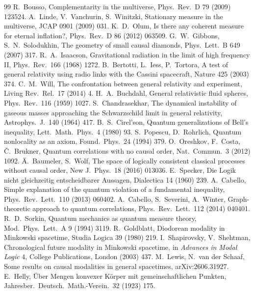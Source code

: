 \documentclass[11pt]{article}
\theoremstyle{definition}
\theoremstyle{remark}
\begin{document}
\begin{thebibliography}{99}
 R.~Bousso, Complementarity in the multiverse, Phys.\ Rev.\ D 79 (2009) 123524.
 A.~Linde, V.~Vanchurin, S.~Winitzki, Stationary measure in the multiverse, JCAP 0901 (2009) 031.
 K.~D.~Olum, Is there any coherent measure for eternal inflation?, Phys.\ Rev.\ D 86 (2012) 063509.
 G.~W.~Gibbons, S.~N.~Solodukhin, The geometry of small causal diamonds, Phys.\ Lett.\ B 649 (2007) 317.
 R.~A.~Isaacson, Gravitational radiation in the limit of high frequency II, Phys.\ Rev.\ 166 (1968) 1272.
 B.~Bertotti, L.~Iess, P.~Tortora, A test of general relativity using radio links with the Cassini spacecraft, Nature 425 (2003) 374.
 C.~M.~Will, The confrontation between general relativity and experiment, Living Rev.\ Rel.\ 17 (2014) 4.
 H.~A.~Buchdahl, General relativistic fluid spheres, Phys.\ Rev.\ 116 (1959) 1027.
 S.~Chandrasekhar, The dynamical instability of gaseous masses approaching the Schwarzschild limit in general relativity, Astrophys.\ J.\ 140 (1964) 417.
 B.~S.~Cirel'son, Quantum generalizations of Bell's inequality, Lett.\ Math.\ Phys.\ 4 (1980) 93.
 S.~Popescu, D.~Rohrlich, Quantum nonlocality as an axiom, Found.\ Phys.\ 24 (1994) 379.
 O.~Oreshkov, F.~Costa, \v{C}.~Brukner, Quantum correlations with no causal order, Nat.\ Commun.\ 3 (2012) 1092.
 \"A.~Baumeler, S.~Wolf, The space of logically consistent classical processes without causal order, New J.\ Phys.\ 18 (2016) 013036.
 E.~Specker, Die Logik nicht gleichzeitig entscheidbarer Aussagen, Dialectica 14 (1960) 239.
 A.~Cabello, Simple explanation of the quantum violation of a fundamental inequality, Phys.\ Rev.\ Lett.\ 110 (2013) 060402.
 A.~Cabello, S.~Severini, A.~Winter, Graph-theoretic approach to quantum correlations, Phys.\ Rev.\ Lett.\ 112 (2014) 040401.
 R.~D.~Sorkin, Quantum mechanics as quantum measure theory, Mod.\ Phys.\ Lett.\ A 9 (1994) 3119.
 R.~Goldblatt, Diodorean modality in Minkowski spacetime, Studia Logica 39 (1980) 219.
 I.~Shapirovsky, V.~Shehtman, Chronological future modality in Minkowski spacetime, in \emph{Advances in Modal Logic} 4, College Publications, London (2003) 437.
 M.~Lewis, N.~van der Schaaf, Some results on causal modalities in general spacetimes, arXiv:2606.31927.
 E.~Helly, \"Uber Mengen konvexer K\"orper mit gemeinschaftlichen Punkten, Jahresber.\ Deutsch.\ Math.-Verein.\ 32 (1923) 175.

\end{thebibliography}
\end{document}
